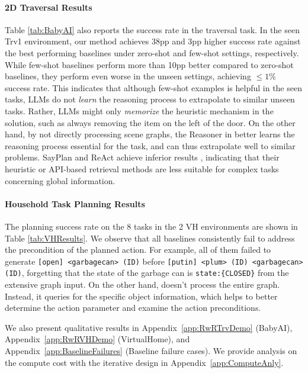 \paragraph{2D Traversal Results} Table \ref{tab:BabyAI} also reports the success rate in the traversal task. In the seen Trv1 environment, our method achieves 38pp and 3pp higher success rate against the best performing baselines under zero-shot and few-shot settings, respectively. While few-shot baselines perform more than 10pp better compared to zero-shot baselines, they perform even worse in the unseen settings, achieving $\leq 1\%$ success rate. This indicates that although few-shot examples is helpful in the seen tasks, LLMs do not \textit{learn} the reasoning process to extrapolate to similar unseen tasks. Rather, LLMs might only \textit{memorize} the heuristic mechanism in the solution, such as always removing the item on the left of the door. On the other hand, by not directly processing scene graphs, the Reasoner in \RwR better learns the reasoning process essential for the task, and can thus extrapolate well to similar problems. SayPlan and ReAct achieve inferior results \RwR, indicating that their heuristic or API-based retrieval methods are less suitable for complex tasks concerning global information.


\paragraph{Household Task Planning Results}
The planning success rate on the 8 tasks in the 2 VH environments are shown in Table \ref{tab:VHResults}. We observe that all baselines consistently fail to address the precondition of the planned action. For example, all of them failed to generate \texttt{\small [open] <garbagecan> (ID)} before \texttt{\small [putin] <plum> (ID) <garbagecan> (ID)}, forgetting that the state of the garbage can is \texttt{\small state:\{CLOSED\}} from the extensive graph input. On the other hand, \RwR doesn't process the entire graph. Instead, it queries for the specific object information, which helps to better determine the action parameter and examine the action preconditions. 

We also present qualitative results in Appendix~\ref{app:RwRTrvDemo} (BabyAI), Appendix~\ref{app:RwRVHDemo} (VirtualHome), and Appendix~\ref{app:BaselineFailures} (Baseline failure cases). We provide analysis on the compute cost with the iterative design in Appendix~\ref{app:ComputeAnly}.


